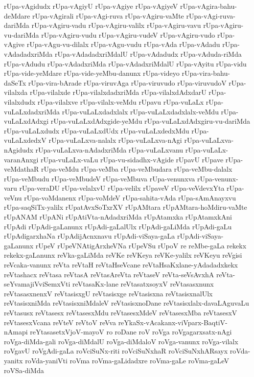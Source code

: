{rUpa-vAgidudx
rUpa-vAgiyU
rUpa-vAgiye
rUpa-vAgiyeV
rUpa-vAgira-bahu-deMdare
rUpa-vAgirali
rUpa-vAgi-ruva
rUpa-vAgiru-vaMte
rUpa-vAgi-ruva-dariMda
rUpa-vAgiru-vadu
rUpa-vAgiru-valilx
rUpa-vAgiru-vavu
rUpa-vAgiru-vu-dariMda
rUpa-vAgiru-vudu
rUpa-vAgiru-vudeV
rUpa-vAgiru-vudo
rUpa-vAgive
rUpa-vAgu-vu-dilalx
rUpa-vAgu-vudu
rUpa-vAda
rUpa-vAdadu
rUpa-vAdadadxriMda
rUpa-vAdadadxriMdalU
rUpa-vAdadudx
rUpa-vAduda-riMda
rUpa-vAdudu
rUpa-vAdadxriMda
rUpa-vAdadxriMdalU
rUpa-vAyitu
rUpa-vidu
rUpa-vide-yeMdare
rUpa-vide-yeMbu-danunx
rUpa-videyo
rUpa-vira-bahu-daSeTx
rUpa-vira-bArade
rUpa-viruvAga
rUpa-viruvudo
rUpa-viruvudoV
rUpa-vilalxda
rUpa-vilalxde
rUpa-vilalxdadxriMda
rUpa-vilalxdAdxdarU
rUpa-vilalxdudx
rUpa-vilalxve
rUpa-vilalx-veMdu
rUpavu
rUpa-vuLaLx
rUpa-vuLaLxdadxriMda
rUpa-vuLaLxdadxlalx
rUpa-vuLaLxdadxlalx-veMdu
rUpa-vuLaLxdAdxgi
rUpa-vuLaLxdAdxgide-yeMdu
rUpa-vuLaLxdAdxgiru-vu-dariMda
rUpa-vuLaLxdudx
rUpa-vuLaLxdUdx
rUpa-vuLaLxdedxMdu
rUpa-vuLaLxdedxV
rUpa-vuLaLxva-nalalx
rUpa-vuLaLxva-nAgi
rUpa-vuLaLxva-nAgidudx
rUpa-vuLaLxva-nAdadxriMda
rUpa-vuLaLxvanu
rUpa-vuLaLx-varanAnxgi
rUpa-vuLaLx-vaLu
rUpa-vu-sidadhx-vAgide
rUpavU
rUpave
rUpa-veMdathaR
rUpa-veMdu
rUpa-veMba
rUpa-veMbudara
rUpa-veMbu-dalalx
rUpa-veMbudu
rUpa-veMbudeV
rUpa-veMbuva
rUpa-venunxva
rUpa-venunx-varu
rUpa-veraDU
rUpa-velalxvU
rUpa-velilx
rUpaveV
rUpa-veVdevxYta
rUpa-veVnu
rUpa-voMdanenx
rUpa-voMdeV
rUpa-sahita-vAda
rUpa-sAmAnayxvu
rUpa-saqSiTx-yalilx
rUpatAvxSoTxrXV
rUpAMtara
rUpAMtara-hoMdiru-vaMte
rUpANAM
rUpANi
rUpAtiVta-nAdadxriMda
rUpAtamxka
rUpAtamxkAni
rUpAdi
rUpAdi-gaLanunx
rUpAdi-gaLalUlx
rUpAdi-gaLiMda
rUpAdi-gaLu
rUpAdigarxhaNa
rUpAdijAcnxnavu
rUpAdi-viSaya-gaLa
rUpAdi-viSaya-gaLanunx
rUpeV
rUpeVNAtigArxheVNa
rUpeVSu
rUpoV
re
reMbe-gaLa
rekekx
rekekx-gaLanunx
reVka-gaLiMda
reVKe
reVKeya
reVKe-yalilx
reVKeyu
reVgisi
reVcaka-vanunx
reVta
reVtaH
reVtaHseVcane
reVtaHsaKxlane-yAdadadxkekx
reVtashacx
reVtasa
reVtasA
reVtasAreVta
reVtaseV
reVta-seVsAvxhA
reVta-seYvamajiVviSemxVti
reVtasaKx-lane
reVtasatxsoyxV
reVtasasxnunx
reVtasasxnenxV
reVtasisxgU
reVtasisxge
reVtasisxna
reVtasisxnalUlx
reVtasisxniMda
reVtasisxniMdaleV
reVtasisxnoDane
reVtasisxlalx-davaLAguvaLu
reVtasusx
reVtasesx
reVtasesxMdu
reVtasesxMdeV
reVtasesxMba
reVtasesxV
reVtasesxVcana
reVteV
reVtoV
reVva
reYkaSx-vAcakanx-viVparx-BaqtiV-nAmapi
reYtasasetxVjoV-mayoV
ro
roDane
roV
roVga
roVgagarxsatx-nAgi
roVga-diMda-gali
roVga-diMdalU
roVga-diMdaloV
roVga-vanunx
roVga-vilalx
roVgavU
roVgAdi-gaLa
roVciSuNx-riti
roVciSuNxhaR
roVciSuNxhARsayx
roVda-yanitx
roVda-yaniVti
roVma
roVma-gaLidadxre
roVma-gaLe
roVma-gaLeV
roVSa-diMda
}
